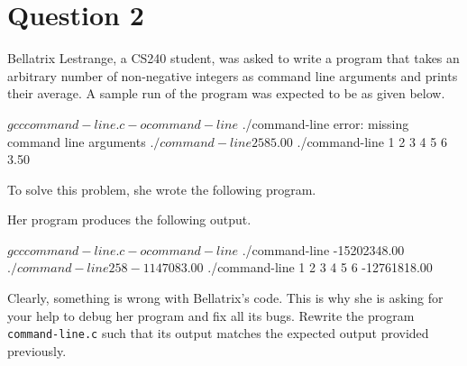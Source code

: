 
\section*{Question 2}

Bellatrix Lestrange, a CS240 student, was asked to write a program that takes an arbitrary number of non-negative integers as command line arguments and prints their average.
A sample run of the program was expected to be as given below.

\begin{terminal}
$ gcc command-line.c -o command-line
$ ./command-line
error: missing command line arguments
$ ./command-line 2 5 8
5.00
$ ./command-line 1 2 3 4 5 6
3.50
\end{terminal}

To solve this problem, she wrote the following program.

\lstset{language=c,tabsize=4}


Her program produces the following output.

\begin{terminal}
$ gcc command-line.c -o command-line
$ ./command-line
-15202348.00
$ ./command-line 2 5 8
-1147083.00
$ ./command-line 1 2 3 4 5 6
-12761818.00
\end{terminal}

Clearly, something is wrong with Bellatrix's code.
This is why she is asking for your help to debug her program and fix all its bugs.
Rewrite the program \texttt{command-line.c} such that its output matches the expected output provided previously.
